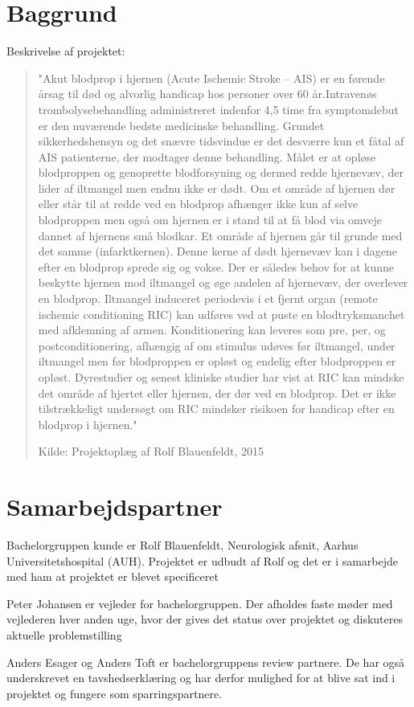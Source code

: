 	\section{Baggrund}
	Beskrivelse af projektet: 
	\begin{quote}
			"Akut blodprop i hjernen (Acute Ischemic Stroke – AIS) er en førende årsag til død og alvorlig handicap hos personer over 60 år.Intravenøs trombolysebehandling administreret indenfor 4,5 time fra symptomdebut er den nuværende bedste medicinske behandling. Grundet sikkerhedshensyn og det snævre tidsvindue er det desværre kun et fåtal af AIS patienterne, der modtager denne behandling. Målet er at opløse blodproppen og genoprette blodforsyning og dermed redde hjernevæv, der lider af iltmangel men endnu ikke er dødt. Om et område af hjernen dør eller står til at redde ved en blodprop afhænger ikke kun af selve blodproppen men også om hjernen er i stand til at få blod via omveje dannet af hjernens små blodkar. Et område af hjernen går til grunde med det samme (infarktkernen). Denne kerne af dødt hjernevæv kan i dagene efter en blodprop sprede sig og vokse. Der er således behov for at kunne beskytte hjernen mod iltmangel og øge andelen af hjernevæv, der overlever en blodprop. Iltmangel induceret periodevis i et fjernt organ (remote ischemic conditioning RIC) kan udføres ved at puste en blodtryksmanchet med afklemning af armen. Konditionering kan leveres som pre, per, og postconditionering, afhængig af om stimulus udøves før iltmangel, under iltmangel men før blodproppen er opløst og endelig efter blodproppen er opløst. Dyrestudier og senest kliniske studier har vist at RIC kan mindske det område af hjertet eller hjernen, der dør ved en blodprop. Det er ikke tilstrækkeligt undersøgt om RIC mindsker risikoen for handicap efter en blodprop i hjernen."
			
			Kilde: Projektoplæg af Rolf Blauenfeldt, 2015
	\end{quote}

		
	\section{Samarbejdspartner}
	Bachelorgruppen kunde er Rolf Blauenfeldt, Neurologisk afsnit, Aarhus Universitetshospital (AUH). Projektet er udbudt af Rolf og det er i samarbejde med ham at projektet er blevet specificeret 
	
	Peter Johansen er vejleder for bachelorgruppen. Der afholdes faste møder med vejlederen hver anden uge, hvor der gives det status over projektet og diskuteres aktuelle problemstilling
	
	Anders Esager og Anders Toft er bachelorgruppens review partnere. De har også underskrevet en tavshedserklæring og har derfor mulighed for at blive sat ind i projektet og fungere som sparringspartnere. 
	